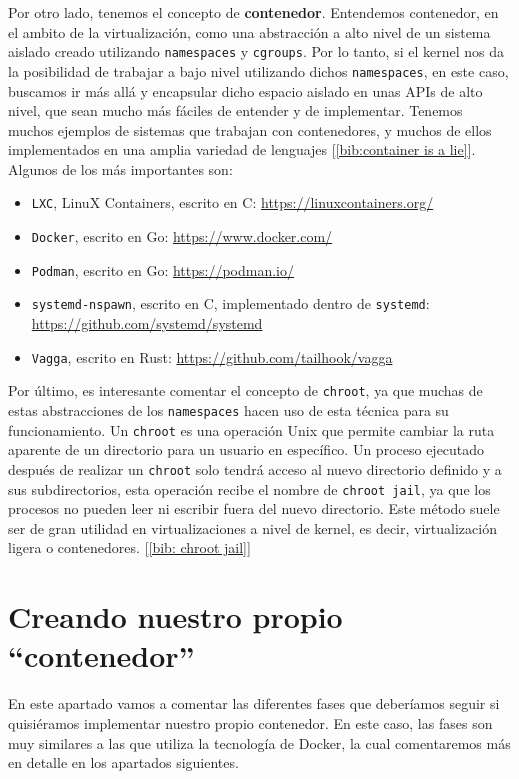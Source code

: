 \documentclass[a4paper, oneside, 12pt]{book}
\begin{document}
	\noindent Por otro lado, tenemos el concepto de \textbf{contenedor}. Entendemos contenedor, en el ambito de la virtualización, como una abstracción a alto nivel de un sistema aislado creado utilizando \texttt{namespaces} y \texttt{cgroups}. Por lo tanto, si el kernel nos da la posibilidad de trabajar a bajo nivel utilizando dichos \texttt{namespaces}, en este caso, buscamos ir más allá y encapsular dicho espacio aislado en unas APIs de alto nivel, que sean mucho más fáciles de entender y de implementar. Tenemos muchos ejemplos de sistemas que trabajan con contenedores, y muchos de ellos implementados en una amplia variedad de lenguajes [\ref{bib:container is a lie}]. Algunos de los más importantes son:
	\begin{itemize}
		\item \texttt{LXC}, LinuX Containers, escrito en C: \url{https://linuxcontainers.org/}
		\item \texttt{Docker}, escrito en Go: \url{https://www.docker.com/}
		\item \texttt{Podman}, escrito en Go: \url{https://podman.io/}
		\item \texttt{systemd-nspawn}, escrito en C, implementado dentro de \texttt{systemd}: \url{https://github.com/systemd/systemd}
		\item \texttt{Vagga}, escrito en Rust: \url{https://github.com/tailhook/vagga}
	\end{itemize}

	\noindent Por último, es interesante comentar el concepto de \texttt{chroot}, ya que muchas de estas abstracciones de los \texttt{namespaces} hacen uso de esta técnica para su funcionamiento. Un \texttt{chroot} es una operación Unix que permite cambiar la ruta aparente de un directorio para un usuario en específico. Un proceso ejecutado después de realizar un \texttt{chroot} solo tendrá acceso al nuevo directorio definido y a sus subdirectorios, esta operación recibe el nombre de \texttt{chroot jail}, ya que los procesos no pueden leer ni escribir fuera del nuevo directorio. Este método suele ser de gran utilidad en virtualizaciones a nivel de kernel, es decir, virtualización ligera o contenedores. [\ref{bib: chroot jail}]
	
	
	\section{Creando nuestro propio ``contenedor''}
	
	\noindent En este apartado vamos a comentar las diferentes fases que deberíamos seguir si quisiéramos implementar nuestro propio contenedor. En este caso, las fases son muy similares a las que utiliza la tecnología de Docker, la cual comentaremos más en detalle en los apartados siguientes. \\
	
\end{document}
